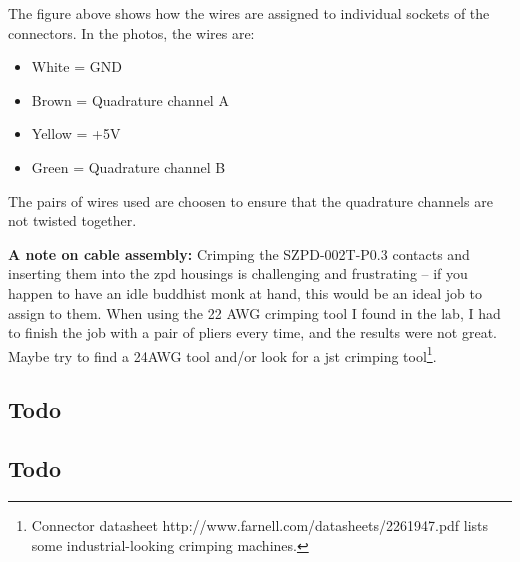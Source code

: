 \documentclass[twoside]{article}
\begin{document}
The figure above shows how the wires are assigned to individual sockets of the connectors. In the photos, the wires are: 

\begin{itemize}
\item White = GND
\item Brown = Quadrature channel A
\item Yellow = +5V
\item Green = Quadrature channel B
\end{itemize}

The pairs of wires used are choosen to ensure that the quadrature channels are not twisted together.

\noindent\textbf{A note on cable assembly:} Crimping the SZPD-002T-P0.3 contacts and inserting them into the zpd housings is challenging and frustrating -- if you happen to have an idle buddhist monk at hand, this would be an ideal job to assign to them. When using the 22 AWG crimping tool I found in the lab, I had to finish the job with a pair of pliers every time, and the results were not great. Maybe try to find a 24AWG tool and/or look for a jst crimping tool\footnote{Connector datasheet http://www.farnell.com/datasheets/2261947.pdf lists some industrial-looking crimping machines.}.

\newpage{}
\subsection{Todo}
\subsection{Todo}
\end{document}
